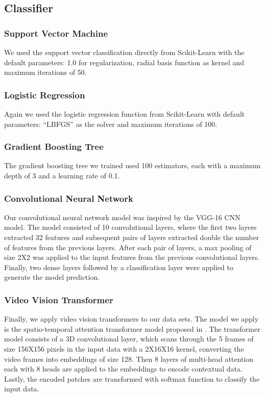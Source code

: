 \documentclass[
	a4paper, %
	10pt, %
	unnumberedsections, %
	twoside, %
]{t0004}
\begin{document}
\subsection{Classifier}

\subsubsection{Support Vector Machine} We used the support vector classification directly from Scikit-Learn with the default parameters: 1.0 for regularization, radial basis function as kernel and maximum iterations of 50.

\subsubsection{Logistic Regression} Again we used the logistic regression function from Scikit-Learn with default parameters: ``LBFGS'' as the solver and maximum iterations of 100.

\subsubsection{Gradient Boosting Tree} The gradient boosting tree we trained used 100 estimators, each with a maximum depth of 3 and a learning rate of 0.1.

\subsubsection{Convolutional Neural Network} Our convolutional neural network model was inspired by the VGG-16 CNN model. The model consisted of 10 convolutional layers, where the first two layers extracted 32 features and subsequent pairs of layers extracted double the number of features from the previous layers. After each pair of layers, a max pooling of size 2X2 was applied to the input features from the previous convolutional layers. Finally, two dense layers followed by a classification layer were applied to generate the model prediction.

\subsubsection{Video Vision Transformer} Finally, we apply video vision transformers to our data sets. The model we apply is the spatio-temporal attention transformer model proposed in \cite{Aarnab:2021qr}. The transformer model consists of a 3D convolutional layer, which scans through the 5 frames of size 156X156 pixels in the input data with a 2X16X16 kernel, converting the video frames into embeddings of size 128. Then 8 layers of multi-head attention each with 8 heads are applied to the embeddings to encode contextual data. Lastly, the encoded patches are transformed with softmax function to classify the input data.
\end{document}
